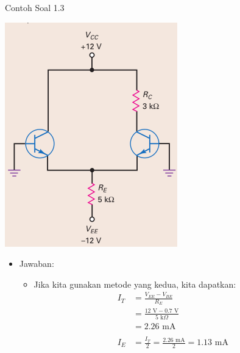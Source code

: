 \documentclass[aspectratio=169]{beamer}
\begin{document}
\begin{frame}{Contoh Soal 1.3}
	\begin{multicols}{2}
		\begin{center}
			\includegraphics[width=0.6\textheight]{gambar/01.latihan_soal_3}
		\end{center}
		\columnbreak
		\begin{itemize}
			\item Jawaban:
			\begin{itemize}
				\item Jika kita gunakan metode yang kedua, kita dapatkan:
				\begin{align*}
					I_T &= \frac{V_{EE} - V_{BE}}{R_E} \\
					&= \frac{12 \text{ V} - 0.7 \text{ V}}{5 \text{ k}\Omega} \\
					&= 2.26 \text{ mA} \\
					\\
					I_E &= \frac{I_T}{2} = \frac{2.26 \text{ mA}}{2} = 1.13 \text{ mA}
				\end{align*}
			\end{itemize}
		\end{itemize}
		\vfill\null
	\end{multicols}
\end{frame}
\end{document}
